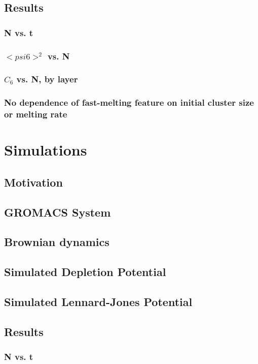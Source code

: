 \documentclass{umthesis}
\begin{document}
\subsection{Results}
\label{sec-1.2.3}
\subsubsection{N vs. t}
\label{sec-1.2.3.1}
\subsubsection{$< psi6 >^2$ vs. N}
\label{sec-1.2.3.2}
\subsubsection{$C_6$ vs. N, by layer}
\label{sec-1.2.3.3}
\subsubsection{No dependence of fast-melting feature on initial cluster size or melting rate}
\label{sec-1.2.3.4}
\section{Simulations}
\label{sec-1.3}
\subsection{Motivation}
\label{sec-1.3.1}
\subsection{GROMACS System}
\label{sec-1.3.2}
\subsection{Brownian dynamics}
\label{sec-1.3.3}
\subsection{Simulated Depletion Potential}
\label{sec-1.3.4}
\subsection{Simulated Lennard-Jones Potential}
\label{sec-1.3.5}
\subsection{Results}
\label{sec-1.3.6}
\subsubsection{N vs. t}
\label{sec-1.3.6.1}
\end{document}
